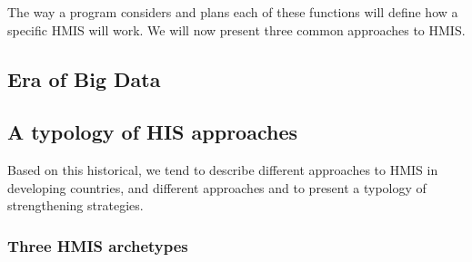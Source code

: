 The way a program considers and plans each of these functions will define how a specific HMIS will work. We will now present three common approaches to HMIS.



\subsection{Era of Big Data}


\subsection{A typology of HIS approaches}

Based on this historical, we tend to describe different approaches to HMIS in developing countries, and different approaches and to present a typology of strengthening strategies.

\subsubsection{Three HMIS archetypes}




